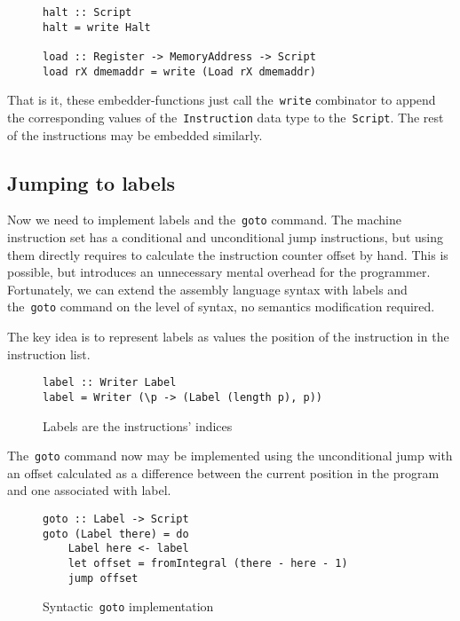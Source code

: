 \begin{figure}[H]
\begin{verbatim}
halt :: Script
halt = write Halt

load :: Register -> MemoryAddress -> Script
load rX dmemaddr = write (Load rX dmemaddr)
\end{verbatim}
\end{figure}

That is it, these embedder-functions just call the~\texttt{write}
combinator to append the corresponding values of the~\texttt{Instruction}
data type to the~\texttt{Script}. The rest of the instructions may
be embedded similarly.

\subsection{Jumping to labels}

Now we need to implement labels and the~\texttt{goto} command. The machine
instruction set has a conditional and unconditional jump instructions, but using them
directly requires to calculate the instruction counter offset by hand. This is possible,
but introduces an unnecessary mental overhead for the programmer. Fortunately, we
can extend the assembly language syntax with labels and the~\texttt{goto}
command on the level of syntax, no semantics modification required.

The key idea is to represent labels as values the position of the instruction in the
instruction list.

\begin{figure}[H]
\begin{verbatim}
label :: Writer Label
label = Writer (\p -> (Label (length p), p))
\end{verbatim}
\caption{Labels are the instructions' indices}
\label{label}
\end{figure}

The~\texttt{goto} command now may be implemented using the unconditional
jump with an offset calculated as a difference between the current position in the program and
one associated with label.

\begin{figure}[H]
\begin{verbatim}
goto :: Label -> Script
goto (Label there) = do
    Label here <- label
    let offset = fromIntegral (there - here - 1)
    jump offset
\end{verbatim}
\caption{Syntactic~\texttt{goto} implementation}
\label{goto}
\end{figure}

